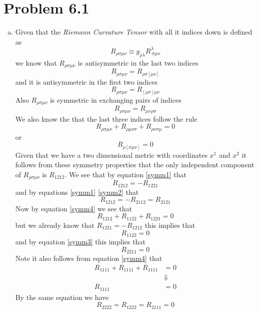 \documentclass[11pt]{article}
\numberwithin{equation}{section}
\newcommand{\HWnum}{6}
\begin{document}


\section{Problem \HWnum.1}
\begin{enumerate}[(a)]
\item
Given that the \emph{Riemann Curvature Tensor} with all it indices down is defined as
\begin{equation}
R_{\rho\sigma\mu\nu} \equiv g_{\rho\lambda}R^{\lambda}_{\ \sigma\mu\nu}
\label{RiemDown}
\end{equation}
we know that $R_{\rho\sigma\mu\nu}$ is antisymmetric in the last two indices 
\begin{equation}
R_{\rho\sigma\mu\nu} = R_{\rho\sigma[\mu\nu]}
\label{symm1}
\end{equation}
and it is antisymmetric in the first two indices
\begin{equation}
R_{\rho\sigma\mu\nu} = R_{[\rho\sigma]\mu\nu}
\label{symm2}
\end{equation}
Also $R_{\rho\sigma\mu\nu}$ is symmetric in exchanging pairs of indices 
\begin{equation}
R_{\rho\sigma\mu\nu} = R_{\mu\nu\rho\sigma}
\label{symm3}
\end{equation}
We also know the that the last three indices follow the rule
$$R_{\rho\sigma\mu\nu} + R_{\rho\mu\nu\sigma} + R_{\rho\nu\sigma\mu} = 0$$
or
\begin{equation}
R_{\rho[\sigma\mu\nu]} = 0
\label{symm4}
\end{equation}
Given that we have a two dimensional metric with coordinates $x^{1}$ and $x^2$ it follows from these symmetry properties that the only independent component of $R_{\rho\sigma\mu\nu}$ is $R_{1212}$. We see that by equation \ref{symm1} that 
$$R_{1212} = - R_{1221}$$
and by equations \ref{symm1} \ref{symm2} that 
$$R_{1212} = -R_{2112} = R_{2121}$$
Now by equation \ref{symm4} we see that
$$R_{1212} + R_{1122} + R_{1221} = 0$$
but we already know that $R_{1221} = -R_{1212}$ this implies that
$$R_{1122} = 0$$
and by equation \ref{symm3} this implies that 
$$R_{2211} = 0$$
Note it also follows from equation \ref{symm4} that
\begin{align*}
R_{1111} + R_{1111} + R_{1111} &= 0\\
&\Downarrow\\
R_{1111} &= 0
\end{align*}
By the same equation we have 
$$R_{2222} = R_{1222} = R_{2111} = 0$$

\end{enumerate}
\end{document}
